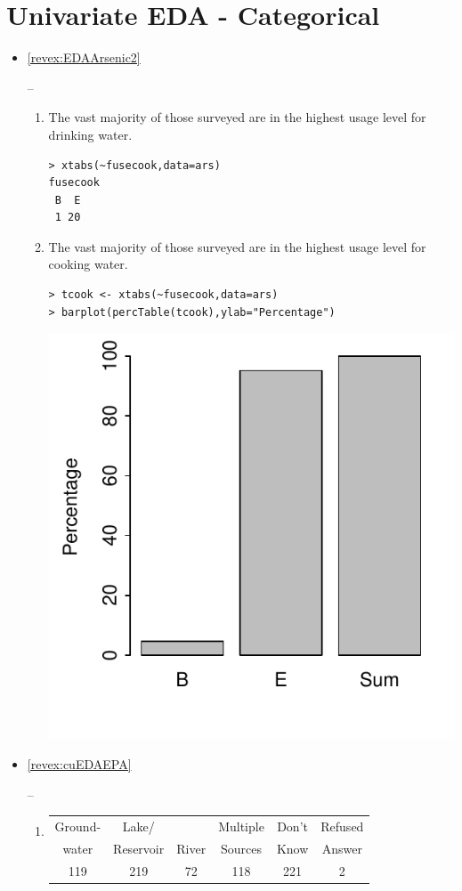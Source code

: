 \documentclass[10pt,openany]{book}\usepackage[]{graphicx}\usepackage[]{color}
\makeatletter
\newenvironment{kframe}{%
 \def\at@end@of@kframe{}%
 \ifinner\ifhmode%
  \def\at@end@of@kframe{\end{minipage}}%
  \begin{minipage}{\columnwidth}%
 \fi\fi%
 \def\FrameCommand##1{\hskip\@totalleftmargin \hskip-\fboxsep
 \colorbox{shadecolor}{##1}\hskip-\fboxsep
     \hskip-\linewidth \hskip-\@totalleftmargin \hskip\columnwidth}%
 \MakeFramed {\advance\hsize-\width
   \@totalleftmargin\z@ \linewidth\hsize
   \@setminipage}}%
 {\par\unskip\endMakeFramed%
 \at@end@of@kframe}
\newenvironment{knitrout}{}{} %
\makeatother
\begin{document}
\section*{Univariate EDA - Categorical}
\begin{itemize}

  \item \hypertarget{ans:EDAArsenic2}{\ref{revex:EDAArsenic2}} --
  \begin{enumerate}
    \item The vast majority of those surveyed are in the highest usage level for drinking water.
\begin{knitrout}
\color{fgcolor}\begin{kframe}
\begin{verbatim}
> xtabs(~fusecook,data=ars)
fusecook
 B  E 
 1 20 
\end{verbatim}
\end{kframe}
\end{knitrout}
    \item The vast majority of those surveyed are in the highest usage level for cooking water.
\begin{knitrout}
\color{fgcolor}\begin{kframe}
\begin{verbatim}
> tcook <- xtabs(~fusecook,data=ars)
> barplot(percTable(tcook),ylab="Percentage")
\end{verbatim}
\end{kframe}

{\centering \includegraphics[width=.4\linewidth]{Figs/ArsBar1-1} 

}



\end{knitrout}
  \end{enumerate}

  \item \hypertarget{ans:cuEDAEPA}{\ref{revex:cuEDAEPA}} --
  \begin{enumerate}
    \item
      \begin{tabular}{c|c|c|c|c|c}
    \hline\hline
    Ground- & Lake/ &  & Multiple & Don't & Refused \\
    water & Reservoir & River & Sources & Know & Answer \\
    \hline
    119 & 219 & 72 & 118 & 221 & 2 \\
    \hline\hline
  \end{tabular}


\end{enumerate}
\end{itemize}
\end{document}
